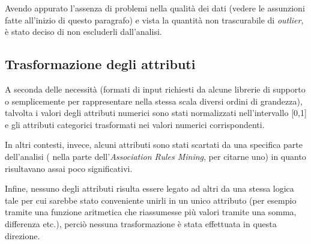 \documentclass[a4paper]{article}
\let\texttt\path
\begin{document}
Avendo appurato l'assenza di problemi nella qualità dei dati (vedere le assunzioni fatte all'inizio di questo paragrafo) e vista la quantità non trascurabile di \textit{outlier}, è stato deciso di non escluderli dall'analisi.

\subsection{Trasformazione degli attributi}

A seconda delle necessità (formati di input richiesti da alcune librerie di supporto o semplicemente per rappresentare nella stessa scala diversi ordini di grandezza), talvolta i valori degli attributi numerici sono stati normalizzati nell'intervallo [0,1] e gli attributi categorici trasformati nei valori numerici corrispondenti. 

In altri contesti, invece, alcuni attributi sono stati scartati da una specifica parte dell'analisi (\texttt{promotion_last_5years} nella parte dell'\textit{Association Rules Mining}, per citarne uno) in quanto risultavano assai poco significativi.

Infine, nessuno degli attributi risulta essere legato ad altri da una stessa logica tale per cui sarebbe stato conveniente unirli in un unico attributo (per esempio tramite una funzione aritmetica che riassumesse più valori tramite una somma, differenza etc.), perciò nessuna trasformazione è stata effettuata in questa direzione. 
\end{document}
